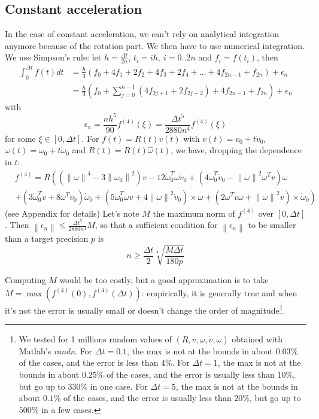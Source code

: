 \documentclass[]{article}
\newcommand{\norm}[1]{\left\| #1 \right\|}
\newcommand{\dt}{\Delta t}
\newcommand{\w}{\omega}
\newcommand{\dw}{\dot{\omega}}
\newcommand{\dv}{\dot{v}}
\begin{document}
\subsection{Constant acceleration}
In the case of constant acceleration, we can't rely on analytical integration anymore because of the rotation part. We then have to use numerical integration. We use Simpson's rule: let $h = \frac{\dt}{2n}$, $t_i = ih,\ i=0..2n$ and $f_i = f(t_i)$, then
\begin{align}
	\int_0^{\dt} f(t) dt &= \frac{h}{3}\left(f_0 + 4 f_1 + 2f_2 + 4 f_3 + 2 f_4 + \ldots + 4f_{2n-1} + f_{2n}\right) + \epsilon_n \\
	& = \frac{h}{3} \left(f_0 + \sum_{j=0}^{n-1} (4 f_{2j+1} + 2 f_{2j+2}) + 4f_{2n-1} + f_{2n}\right) + \epsilon_n
\end{align}
with
\begin{equation}
	\epsilon_n = \frac{nh^5}{90}f^{(4)}(\xi) = \frac{\dt^5}{2880n^4}f^{(4)}(\xi)
\end{equation}
for some $\xi \in \left[0,\dt\right]$.
\newline
For $f(t) = R(t)v(t)$ with $v(t) = v_0 + t \dv_0$, $\w(t) = \w_0 + t \dw_0$ and $\dot{R}(t) = R(t)\hat{\w}(t)$, we have, dropping the dependence in $t$:
\begin{align}
	&f^{(4)} = R \left((\norm{\w}^4-3\norm{\dw_0}^2)v -12\dw_0^T \w \dv_0 + (4\dw_0^T \dv_0 - \norm{\w}^2\w^T v)\w\right. \nonumber\\
	& \left. + (3\dw_0^T v + 8\w^T \dv_0)\dw_0+(5\dw_0^T \w v + 4\norm{\w}^2 \dv_0) \times \w + (2 \w^T v\w + \norm{\w}^2 v) \times \dw_0\right)\nonumber
\end{align}
(see Appendix for details)
\newline
Let's note $M$ the maximum norm of $f^{(4)}$ over $\left[0,\dt\right]$. Then $\norm{\epsilon_n} \leq \frac{\dt^5}{2880n^4}M$, so that a sufficient condition for $\norm{\epsilon_n}$ to be smaller than a target precision $p$ is
\begin{equation}
  n \geq \frac{\dt}{2} \sqrt[4]{\frac{M\dt}{180p}}
\end{equation}

Computing $M$ would be too costly, but a good approximation is to take $M = \max(f^{(4)}(0),f^{(4)}(\dt))$: empirically, it is generally true and when it's not the error is usually small or doesn't change the order of magnitude\footnote{We tested for 1 millions random values of $(R,v,\w,\dv,\dw)$ obtained with Matlab's \emph{randn}. For $\dt=0.1$, the max is not at the bounds in about $0.03\%$ of the cases, and the error is less than $4\%$. For $\dt=1$, the max is not at the bounds in about $0.25\%$ of the cases, and the error is usually less than $10\%$, but go up to $330\%$ in one case. For $\dt=5$, the max is not at the bounds in about $0.1\%$ of the cases, and the error is usually less than $20\%$, but go up to $500\%$ in a few cases.}.
\end{document}
